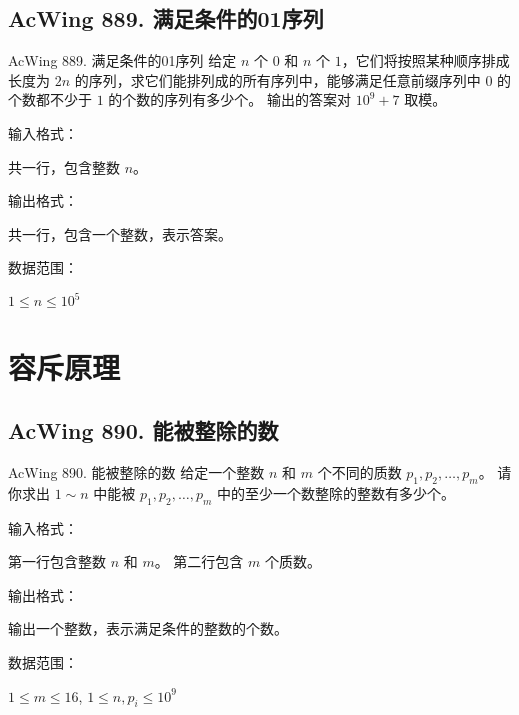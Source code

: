 \subsection{AcWing 889. 满足条件的01序列}
\begin{titledbox}{AcWing 889. 满足条件的01序列}
    给定 $n$ 个 $0$ 和 $n$ 个 $1$，它们将按照某种顺序排成长度为 $2n$ 的序列，求它们能排列成的所有序列中，能够满足任意前缀序列中 $0$ 的个数都不少于 $1$ 的个数的序列有多少个。 输出的答案对 $10^9+7$ 取模。

    输入格式：

    共一行，包含整数 $n$。

    输出格式：

    共一行，包含一个整数，表示答案。

    数据范围：

    $1 \le n \le 10^5$

    \begin{inputblock}
    \end{inputblock}
    \begin{outputblock}
    \end{outputblock}
\end{titledbox}


\section{容斥原理}

\subsection{AcWing 890. 能被整除的数}
\begin{titledbox}{AcWing 890. 能被整除的数}
    给定一个整数 $n$ 和 $m$ 个不同的质数 $p_1, p_2, \dots, p_m$。 请你求出 $1 \sim n$ 中能被 $p_1, p_2, \dots, p_m$ 中的至少一个数整除的整数有多少个。

    输入格式：

    第一行包含整数 $n$ 和 $m$。 第二行包含 $m$ 个质数。

    输出格式：

    输出一个整数，表示满足条件的整数的个数。

    数据范围：

    $1 \le m \le 16$, $1 \le n,p_i \le 10^9$

    \begin{inputblock}
         \\
    \end{inputblock}
    \begin{outputblock}
    \end{outputblock}
\end{titledbox}


